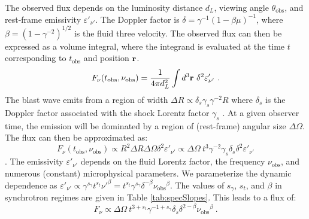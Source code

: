 \documentclass[twocolumn]{aastex62}
\newcommand{\tobs}{\ensuremath{t_{\mathrm{obs}}}}
\newcommand{\nuobs}{\ensuremath{\nu_{\mathrm{obs}}}}
\newcommand{\thobs}{\ensuremath{\theta_{\mathrm{obs}}}}
\begin{document}
The observed flux depends on the luminosity distance $d_L$, viewing angle $\thobs$, and rest-frame emissivity $\varepsilon'_{\nu'}$.  The Doppler factor is $\delta = \gamma^{-1} (1-\beta\mu)^{-1}$, where $\beta=(1-\gamma^{-2})^{1/2}$ is the fluid three velocity.  The observed flux can then be expressed as a volume integral, where the integrand is evaluated at the time $t$ corresponding to $\tobs$ and position ${\bf r}$.
\begin{equation}
	F_\nu(\tobs, \nuobs) = \frac{1}{4\pi d_L^2} \int d^3{\bf r} \ \delta^2 \varepsilon'_{\nu'}\ .
\end{equation}  
The blast wave emits from a region of width $\Delta R \propto \delta_s \gamma_s \gamma^{-2} R $ where $\delta_s$ is the Doppler factor associated with the shock Lorentz factor $\gamma_s$ \citep{van-Eerten:2010aa, van-Eerten:2018ab}. At a given observer time, the emission will be dominated by a region of (rest-frame) angular size $\Delta \Omega$.  The flux can then be approximated as:
\begin{equation}
	F_\nu(\tobs, \nuobs) \propto R^2 \Delta R \Delta \Omega \delta^2 \varepsilon'_{\nu'} \propto \Delta \Omega\ t^3 \gamma^{-2} \gamma_s \delta_s \delta^2 \varepsilon'_{\nu'}
\end{equation}.
The emissivity $\varepsilon'_{\nu'}$ depends on the fluid Lorentz factor, the frequency $\nuobs$, and numerous (constant) microphysical parameters.  We parameterize the dynamic dependence as $\varepsilon'_{\nu'} \propto \gamma^{s_\gamma} t^{s_t} {\nu'}^\beta = t^{s_t} \gamma^{s_\gamma}\delta^{-\beta} \nuobs^\beta$. The values of $s_\gamma$, $s_t$, and $\beta$ in synchrotron regimes are given in Table \ref{tab:specSlopes}.  This leads to a flux of:
\begin{equation}
	F_\nu \propto \Delta \Omega\ t^{3+s_t} \gamma^{-1+s_\gamma} \delta_s \delta^{2-\beta} \nuobs^\beta\ . \label{eq:app:fluxApprox}
\end{equation}
\end{document}
